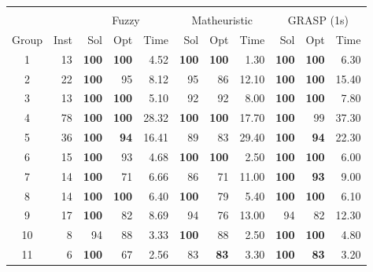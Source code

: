 \documentclass[preprint,12pt,authoryear]{elsarticle}
\begin{document}
\begin{table}[h]
\begin{tabular}{cr|rrr|rrr|rrr}
         \multicolumn{11}{c}{}\\
        \multicolumn{2}{c}{}      & \multicolumn{3}{c}{Fuzzy}            & \multicolumn{3}{c}{Matheuristic}     & \multicolumn{3}{c}{GRASP (1s)}        \\\hline
        Group & Inst & Sol           & Opt          & Time  & Sol          & Opt          & Time   & Sol           & Opt           & Time  \\\hline
        1     & 13   & \textbf{100}  & \textbf{100} & 4.52  & \textbf{100} & \textbf{100} & 1.30   & \textbf{100}  & \textbf{100}  & 6.30  \\
        2     & 22   & \textbf{100}  & 95           & 8.12  & 95           & 86           & 12.10  & \textbf{100}  & \textbf{100}  & 15.40 \\
        3     & 13   & \textbf{100}  & \textbf{100} & 5.10  & 92           & 92           & 8.00   & \textbf{100}  & \textbf{100}  & 7.80  \\
        4     & 78   & \textbf{100}  & \textbf{100} & 28.32 & \textbf{100} & \textbf{100} & 17.70  & \textbf{100}  & 99            & 37.30 \\
        5     & 36   & \textbf{100}  & \textbf{94}  & 16.41 & 89           & 83           & 29.40  & \textbf{100}  & \textbf{94}   & 22.30 \\
        6     & 15   & \textbf{100}  & 93           & 4.68  & \textbf{100} & \textbf{100} & 2.50   & \textbf{100}  & \textbf{100}  & 6.00  \\
        7     & 14   & \textbf{100}  & 71           & 6.66  & 86           & 71           & 11.00  & \textbf{100}  & \textbf{93}   & 9.00  \\
        8     & 14   & \textbf{100}  & \textbf{100} & 6.40  & \textbf{100} & 79           & 5.40   & \textbf{100}  & \textbf{100}  & 6.10  \\
        9     & 17   & \textbf{100}  & 82           & 8.69  & 94           & 76           & 13.00  & 94            & 82            & 12.30 \\
        10    & 8    & 94            & 88           & 3.33  & \textbf{100} & 88           & 2.50   & \textbf{100}  & \textbf{100}  & 4.80  \\
        11    & 6    & \textbf{100}  & 67           & 2.56  & 83           & \textbf{83}  & 3.30   & \textbf{100}  & \textbf{83}   & 3.20  \\\hline
        \end{tabular}
\end{table}
\end{document}
